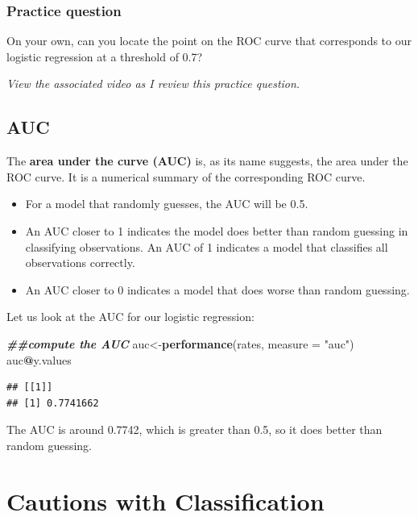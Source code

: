 \documentclass[
]{book}
\newenvironment{Shaded}{\begin{snugshade}}{\end{snugshade}}
\newcommand{\AttributeTok}[1]{\textcolor[rgb]{0.13,0.29,0.53}{#1}}
\newcommand{\DocumentationTok}[1]{\textcolor[rgb]{0.56,0.35,0.01}{\textbf{\textit{#1}}}}
\newcommand{\FunctionTok}[1]{\textcolor[rgb]{0.13,0.29,0.53}{\textbf{#1}}}
\newcommand{\NormalTok}[1]{#1}
\newcommand{\OtherTok}[1]{\textcolor[rgb]{0.56,0.35,0.01}{#1}}
\newcommand{\SpecialCharTok}[1]{\textcolor[rgb]{0.81,0.36,0.00}{\textbf{#1}}}
\newcommand{\StringTok}[1]{\textcolor[rgb]{0.31,0.60,0.02}{#1}}
\providecommand{\tightlist}{%
  \setlength{\itemsep}{0pt}\setlength{\parskip}{0pt}}
\begin{document}
\hypertarget{practice-question-4}{%
\subsubsection{Practice question}\label{practice-question-4}}

On your own, can you locate the point on the ROC curve that corresponds to our logistic regression at a threshold of 0.7?

\emph{View the associated video as I review this practice question.}

\hypertarget{auc}{%
\subsection{AUC}\label{auc}}

The \textbf{area under the curve (AUC)} is, as its name suggests, the area under the ROC curve. It is a numerical summary of the corresponding ROC curve.

\begin{itemize}
\tightlist
\item
  For a model that randomly guesses, the AUC will be 0.5.
\item
  An AUC closer to 1 indicates the model does better than random guessing in classifying observations. An AUC of 1 indicates a model that classifies all observations correctly.
\item
  An AUC closer to 0 indicates a model that does worse than random guessing.
\end{itemize}

Let us look at the AUC for our logistic regression:

\begin{Shaded}
\begin{Highlighting}[]
\DocumentationTok{\#\#compute the AUC}
\NormalTok{auc}\OtherTok{\textless{}{-}}\FunctionTok{performance}\NormalTok{(rates, }\AttributeTok{measure =} \StringTok{"auc"}\NormalTok{)}
\NormalTok{auc}\SpecialCharTok{@}\NormalTok{y.values}
\end{Highlighting}
\end{Shaded}

\begin{verbatim}
## [[1]]
## [1] 0.7741662
\end{verbatim}

The AUC is around 0.7742, which is greater than 0.5, so it does better than random guessing.

\hypertarget{cautions-with-classification}{%
\section{Cautions with Classification}\label{cautions-with-classification}}
\end{document}
